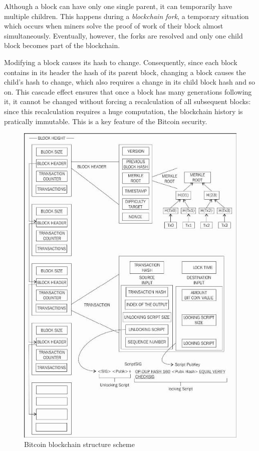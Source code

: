 Although a block can have only one single parent, it can temporarily have
multiple children. This happens during a \emph{blockchain fork}, a temporary
situation which occurs when miners solve the proof of work of their block almost
simultaneously. Eventually, however, the forks are resolved and  only one child
block becomes part of the blockchain.

Modifying a block causes its hash to change. Consequently, since each block
contains in its header the hash of its parent block, changing a block causes
the child’s hash to change, which also requires a change in its child block hash
and so on. This cascade effect ensures that once a block has many generations
following it, it cannot be changed without forcing a recalculation of all
subsequent blocks: since this recalculation requires a huge computation, the
blockchain history is pratically immutable. This is a key feature of the Bitcoin
security.

\begin{figure}[!htb]
	\centering
	\includegraphics[width=0.9\linewidth]{img/bitcoin-blockchain-scheme.png}
	\caption{Bitcoin blockchain structure scheme}
	\label{fig:bitcoin-blockchain}
\end{figure}


